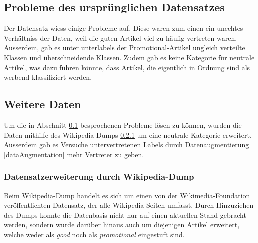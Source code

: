 \subsection{Probleme des ursprünglichen Datensatzes}
\label{ProblemeDatensatz}
Der Datensatz wiess einige Probleme auf. Diese waren zum einen ein unechtes Verhältniss der Daten, weil die guten Artikel viel zu häufig vertreten waren. Ausserdem, gab es unter unterlabels der Promotional-Artikel ungleich verteilte Klassen und überschneidende Klassen. Zudem gab es keine Kategorie für neutrale Artikel, was dazu führen könnte, dass Artikel, die eigentlich in Ordnung sind als werbend klassifiziert werden.



\subsection{Weitere Daten}
Um die in Abschnitt \ref{ProblemeDatensatz} besprochenen Probleme lösen zu können, wurden die Daten mithilfe des Wikipedia Dumps \ref{WPDump} um eine neutrale Kategorie erweitert. Ausserdem gab es Versuche untervertretenen Labels durch Datenaugmentierung \ref{dataAugmentation} mehr Vertreter zu geben.

\subsubsection{Datensatzerweiterung durch Wikipedia-Dump}
\label{WPDump}
Beim Wikipedia-Dump handelt es sich um einen von der Wikimedia-Foundation veröffentlichten Datensatz, der alle Wikipedia-Seiten umfasst. Durch Hinzuziehen des Dumps konnte die Datenbasis nicht nur auf einen aktuellen Stand gebracht werden, sondern wurde darüber hinaus auch um diejenigen Artikel erweitert, welche weder als \emph{good} noch als \emph{promotional} eingestuft sind.

